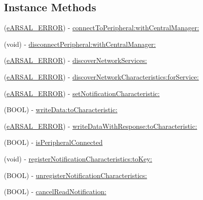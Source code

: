 \subsection*{Instance Methods}
\begin{DoxyCompactItemize}
\item 
(\hyperlink{ARSAL__Error_8h_a95978608019620b9d7e573ad874e5889}{e\+A\+R\+S\+A\+L\+\_\+\+E\+R\+R\+OR}) -\/ \hyperlink{interfaceARSAL__BLEManager_ad4f53997e9972a69ea5d33907f58a08c}{connect\+To\+Peripheral\+:with\+Central\+Manager\+:}
\item 
(void) -\/ \hyperlink{interfaceARSAL__BLEManager_a4bbebe90b27a85c42c2e24496b3ef87a}{disconnect\+Peripheral\+:with\+Central\+Manager\+:}
\item 
(\hyperlink{ARSAL__Error_8h_a95978608019620b9d7e573ad874e5889}{e\+A\+R\+S\+A\+L\+\_\+\+E\+R\+R\+OR}) -\/ \hyperlink{interfaceARSAL__BLEManager_afe64e431550c1a417f8c4bba8725e5cd}{discover\+Network\+Services\+:}
\item 
(\hyperlink{ARSAL__Error_8h_a95978608019620b9d7e573ad874e5889}{e\+A\+R\+S\+A\+L\+\_\+\+E\+R\+R\+OR}) -\/ \hyperlink{interfaceARSAL__BLEManager_ae0cdcbf690a6b37b5aa440338eedea3d}{discover\+Network\+Characteristics\+:for\+Service\+:}
\item 
(\hyperlink{ARSAL__Error_8h_a95978608019620b9d7e573ad874e5889}{e\+A\+R\+S\+A\+L\+\_\+\+E\+R\+R\+OR}) -\/ \hyperlink{interfaceARSAL__BLEManager_aff5bd57546b8e2e337d0d890749be942}{set\+Notification\+Characteristic\+:}
\item 
(B\+O\+OL) -\/ \hyperlink{interfaceARSAL__BLEManager_ae708dcfc73ba14001397bd7a9fabdef5}{write\+Data\+:to\+Characteristic\+:}
\item 
(\hyperlink{ARSAL__Error_8h_a95978608019620b9d7e573ad874e5889}{e\+A\+R\+S\+A\+L\+\_\+\+E\+R\+R\+OR}) -\/ \hyperlink{interfaceARSAL__BLEManager_a9215414f0744c885157a4f705469e482}{write\+Data\+With\+Response\+:to\+Characteristic\+:}
\item 
(B\+O\+OL) -\/ \hyperlink{interfaceARSAL__BLEManager_a456d597ceee1eb99c23ce9f8fe0b7fc1}{is\+Peripheral\+Connected}
\item 
(void) -\/ \hyperlink{interfaceARSAL__BLEManager_a2bfe42d81086019fc3f10c640a8ea14a}{register\+Notification\+Characteristics\+:to\+Key\+:}
\item 
(B\+O\+OL) -\/ \hyperlink{interfaceARSAL__BLEManager_a7ab976168376b677b14075f0d8f1d3cf}{unregister\+Notification\+Characteristics\+:}
\item 
(B\+O\+OL) -\/ \hyperlink{interfaceARSAL__BLEManager_ab9712e7ca6da641483664d1ebdfbc690}{cancel\+Read\+Notification\+:}

\end{DoxyCompactItemize}
